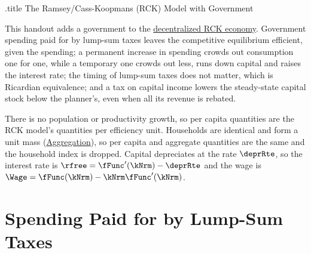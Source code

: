 \documentclass{econark}
\begin{document}
\handoutHeader

\begin{verbatimwrite}{\jobname.title}
  The Ramsey/Cass-Koopmans (RCK) Model with Government
\end{verbatimwrite}

\handoutNameMake

This handout adds a government to the \href{https://intertemporal-choice.github.io/content/growth/decentralizingrck/}{decentralized RCK economy}. Government spending paid for by lump-sum taxes leaves the competitive equilibrium efficient, given the spending; a permanent increase in spending crowds out consumption one for one, while a temporary one crowds out less, runs down capital and raises the interest rate; the timing of lump-sum taxes does not matter, which is Ricardian equivalence; and a tax on capital income lowers the steady-state capital stock below the planner's, even when all its revenue is rebated.

There is no population or productivity growth, so per capita quantities are the RCK model's quantities per efficiency unit. Households are identical and form a unit mass (\href{https://intertemporal-choice.github.io/content/appendices/mathematical/aggregation/}{Aggregation}), so per capita and aggregate quantities are the same and the household index is dropped. Capital depreciates at the rate $\deprRte$, so the interest rate is $\rfree = \fFunc^{\prime}(\kNrm) - \deprRte$ and the wage is $\Wage = \fFunc(\kNrm) - \kNrm\fFunc^{\prime}(\kNrm)$.

\section{Spending Paid for by Lump-Sum Taxes}\label{sec:RCKGov-LumpSum}
\end{document}
